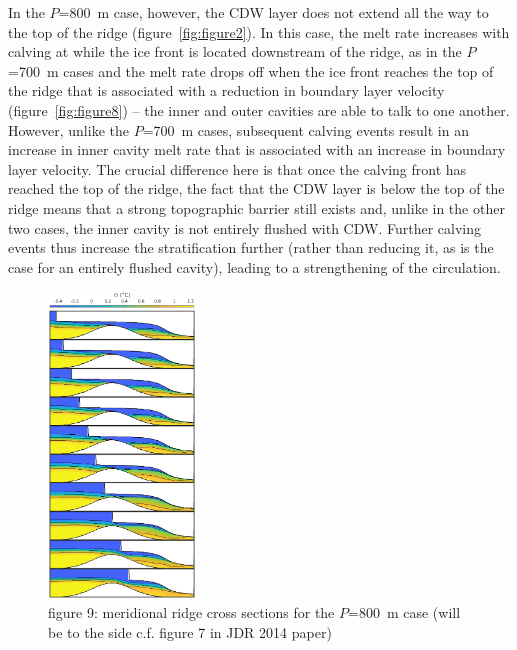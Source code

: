 \documentclass[draft]{agujournal2019}
\begin{document}
In the $P$=800~m case, however, the CDW layer does not extend all the way to the top of the ridge (figure~\ref{fig:figure2}). In this case, the melt rate increases with calving at while the ice front is located downstream of the ridge, as in the $P$=700~m cases and the melt rate drops off when the ice front reaches the top of the ridge that is associated with a reduction in boundary layer velocity (figure~\ref{fig:figure8}) -- the inner and outer cavities are able to talk to one another. However, unlike the $P$=700~m cases, subsequent calving events result in an increase in inner cavity melt rate that is associated with an increase in boundary layer velocity. The crucial difference here is that once the calving front has reached the top of the ridge, the fact that the CDW layer is below the top of the ridge means that a strong topographic barrier still exists and, unlike in the other two cases, the inner cavity is not entirely flushed with CDW. Further calving events thus increase the stratification further (rather than reducing it, as is the case for an entirely flushed cavity), leading to a strengthening of the circulation. 


\begin{figure}
    \centering
    \includegraphics[width = 0.35\textwidth]{../make_figures/plots/figure9.eps}
    \caption{figure 9: meridional ridge cross sections for the $P$=800~m case (will be to the side c.f. figure 7 in JDR 2014 paper) }
    \label{fig:figure9}
\end{figure}
\end{document}
